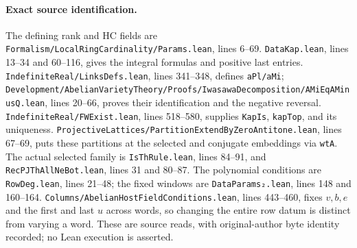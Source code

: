 \paragraph{Exact source identification.}
The defining rank and HC fields are
\texttt{Formalism/LocalRingCardinality/Params.lean}, lines 6--69.
\texttt{DataKap.lean}, lines 13--34 and 60--116, gives the integral
formulas and positive last entries.
\texttt{IndefiniteReal/LinksDefs.lean}, lines 341--348, defines
\texttt{aPl/aMi};
\texttt{Development/AbelianVarietyTheory/Proofs/IwasawaDecomposition/AMiEqAMinusQ.lean},
lines 20--66, proves their identification and the negative reversal.
\texttt{IndefiniteReal/FWExist.lean}, lines 518--580, supplies
\texttt{KapIs}, \texttt{kapTop}, and its uniqueness.
\texttt{ProjectiveLattices/PartitionExtendByZeroAntitone.lean}, lines 67--69,
puts these partitions at the selected and conjugate embeddings via
\texttt{wtA}. The actual selected family is
\texttt{IsThRule.lean}, lines 84--91, and
\texttt{RecPJThAllNeBot.lean}, lines 31 and 80--87.
The polynomial conditions are \texttt{RowDeg.lean}, lines 21--48;
the fixed windows are \texttt{DataParams₂.lean}, lines 148 and 160--164.
\texttt{Columns/AbelianHostFieldConditions.lean}, lines 443--460, fixes
$v,b,e$ and the first and last $u$ across words, so changing the entire
row datum is distinct from varying a word.
These are source reads, with original-author byte identity recorded;
no Lean execution is asserted.
